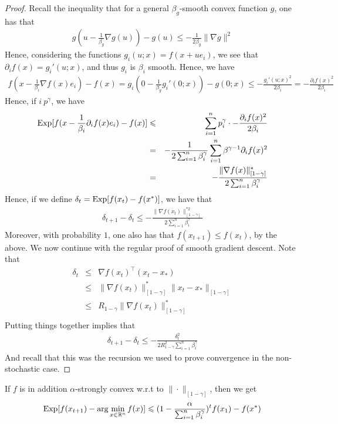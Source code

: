 	\begin{proof}
	Recall the inequality that for a general $\beta_g$-smooth convex function $g$, one has that
	\begin{eqnarray}
	g(u - \frac{1}{\beta_g}\nabla g(u)) - g(u) \le -\frac{1}{2\beta_g} \|\nabla g\|^2
	\end{eqnarray}
	Hence, considering the functions $g_i(u;x) = f(x + ue_i)$, we see that $\partial_i f(x) = g_i'(u;x)$, and thus $g_i$ is $\beta_i$ smooth. Hence, we have 
	\begin{eqnarray}
	f(x - \frac{1}{\beta_i}\nabla f(x)e_i) - f(x) = 
	g_i(0 - \frac{1}{\beta_g}g_i'(0;x)) - g(0;x) \le -\frac{g_i'(u;x)^2}{2\beta_i} = - \frac{\partial_i f(x)^2}{2\beta_i}
	\end{eqnarray}
	Hence, if $i~p^\gamma$, we have
	\begin{eqnarray}
	\mathrm{Exp}[f(x - \frac{1}{\beta_i}\partial_i f(x)e_i) - f(x)] &\leqslant& \sum_{i=1}^n p_i^\gamma \cdot - \frac{\partial_i f(x)^2}{2\beta_i}\\
	&=& -\frac{1}{2\sum_{i=1}^n \beta_i^{\gamma}} \sum_{i=1}^n \beta^{\gamma - 1}\partial_i f(x)^2 \\
	&=& -\frac{\|\nabla f(x)\|^*_{[1-\gamma]}}{2\sum_{i=1}^n \beta_i^{\gamma}}
	\end{eqnarray}
	Hence, if we define $\delta_t = \mathrm{Exp}[f(x_t) - f(x^*)]$, we have that
	\begin{eqnarray}
	\delta_{t+1} - \delta_t \le -\frac{\|\nabla f(x_t)\|^{*2}_{[1-\gamma]}}{2\sum_{i=1}^n \beta_i^{\gamma}} 
	\end{eqnarray}
	Moreover, with probability $1$, one also has that $f(x_{t+1}) \le f(x_t)$, by the above. We now continue with the regular proof of smooth gradient descent. Note that
	\begin{eqnarray*}
	\delta_t &\le& \nabla f(x_t)^\top(x_t - x_*)\\
	&\le& \|\nabla f(x_t)\|_{[1-\gamma]}^*\|x_t - x_*\|_{[1-\gamma]}\\
	&\le& R_{1-\gamma}\|\nabla f(x_t)\|_{[1-\gamma]}^*\\
	\end{eqnarray*}
	Putting things together implies that
	\begin{eqnarray}
	\delta_{t+1} - \delta_t \le -\frac{\delta_t^2}{2R_{1-\gamma}^2\sum_{i=1}^n \beta_i^{\gamma}} 
	\end{eqnarray}
	And recall that this was the recursion we used to prove convergence in the non-stochastic case.
	\end{proof}
	\begin{theorem} If $f$ is in addition $\alpha$-strongly convex w.r.t to $\|\cdot\|_{[1-\gamma]}$, then we get 
	\begin{eqnarray}
	\mathrm{Exp}[f(x_{t+1}) - \arg\min_{x \in \mathbb{R}^{n}} f(x)] \leqslant (1 - \frac{\alpha}{\sum_{i=1}^n \beta_i^\gamma})^t f(x_1) - f(x^*)
	\end{eqnarray}
	\end{theorem}
